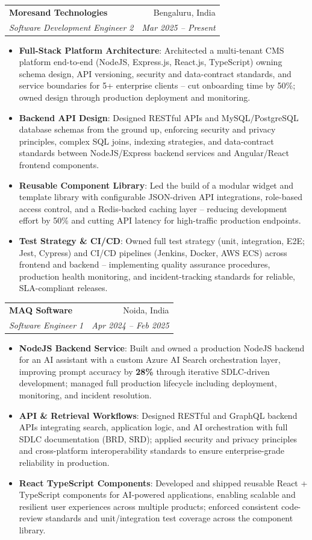 \documentclass[a4paper,20pt]{article}
\makeatletter
\newcommand{\resumeItem}[2]{\item\small{\textbf{#1}{: #2 \vspace{-2pt}}}}
\newcommand{\resumeSubheading}[4]{\vspace{-1pt}\item\begin{tabular*}{0.97\textwidth}{l@{\extracolsep{\fill}}r}\textbf{#1} & #2 \\\textit{#3} & \textit{#4} \\\end{tabular*}\vspace{-5pt}}
\newcommand{\resumeItemListStart}{\begin{itemize}}
\newcommand{\resumeItemListEnd}{\end{itemize}\vspace{-5pt}}
\makeatother
\begin{document}
  \resumeSubheading
    {Moresand Technologies}{Bengaluru, India}
    {Software Development Engineer 2}{Mar 2025 -- Present}
    \resumeItemListStart
      \resumeItem{Full-Stack Platform Architecture}{Architected a multi-tenant CMS platform end-to-end (NodeJS, Express.js, React.js, TypeScript) owning schema design, API versioning, security and data-contract standards, and service boundaries for 5+ enterprise clients -- cut onboarding time by 50\%; owned design through production deployment and monitoring.}
      \resumeItem{Backend API Design}{Designed RESTful APIs and MySQL/PostgreSQL database schemas from the ground up, enforcing security and privacy principles, complex SQL joins, indexing strategies, and data-contract standards between NodeJS/Express backend services and Angular/React frontend components.}
      \resumeItem{Reusable Component Library}{Led the build of a modular widget and template library with configurable JSON-driven API integrations, role-based access control, and a Redis-backed caching layer -- reducing development effort by 50\% and cutting API latency for high-traffic production endpoints.}
      \resumeItem{Test Strategy \& CI/CD}{Owned full test strategy (unit, integration, E2E; Jest, Cypress) and CI/CD pipelines (Jenkins, Docker, AWS ECS) across frontend and backend -- implementing quality assurance procedures, production health monitoring, and incident-tracking standards for reliable, SLA-compliant releases.}
    \resumeItemListEnd

  \resumeSubheading
    {MAQ Software}{Noida, India}
    {Software Engineer 1}{Apr 2024 -- Feb 2025}
    \resumeItemListStart
      \resumeItem{NodeJS Backend Service}{Built and owned a production NodeJS backend for an AI assistant with a custom Azure AI Search orchestration layer, improving prompt accuracy by \textbf{28\%} through iterative SDLC-driven development; managed full production lifecycle including deployment, monitoring, and incident resolution.}
      \resumeItem{API \& Retrieval Workflows}{Designed RESTful and GraphQL backend APIs integrating search, application logic, and AI orchestration with full SDLC documentation (BRD, SRD); applied security and privacy principles and cross-platform interoperability standards to ensure enterprise-grade reliability in production.}
      \resumeItem{React TypeScript Components}{Developed and shipped reusable React + TypeScript components for AI-powered applications, enabling scalable and resilient user experiences across multiple products; enforced consistent code-review standards and unit/integration test coverage across the component library.}
    \resumeItemListEnd
\end{document}
